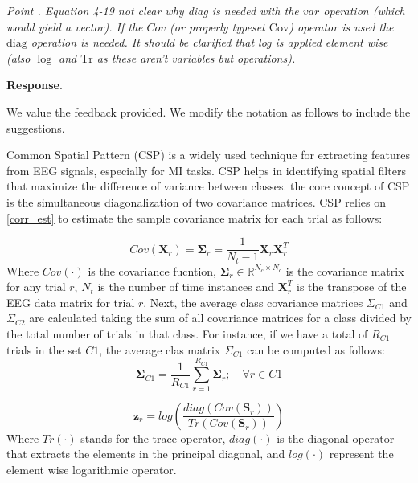 \documentclass[runningheads]{llncs}
\newcommand{\Real}{\mathbb{R}}
\newcommand{\Tr}[1]{Tr \left( #1 \right)}
\newcommand{\diag}[1]{diag \left( #1 \right)}
\newcommand{\ve}[1]{\bm {#1}}
\newcommand{\mat}[1]{\bm {#1}}
\newenvironment{reviewer}{\setcounter{pointcounter}{1}}{}
\newcommand{\changes}[1]{\textcolor[rgb]{1.00,0.00,0.00}{#1}}
\newcommand{\point}[1]{\medskip \noindent
 \textsl{{\fontseries{b}\selectfont Point \thepointcounter}.
 \stepcounter{pointcounter} #1}}
\newcommand{\reply}{\medskip \noindent \textbf{Response}.\ }
\begin{document}
\begin{reviewer}
{}

\point{Equation 4-19 not clear why diag is needed with the $var$ operation (which would yield a vector). If the $Cov$ (or properly typeset $\mathrm{Cov}$) operator is used the $\mathrm{diag}$ operation is needed.   It should be clarified that log is applied element wise (also $\log$ and $\mathrm{Tr}$ as these aren't variables but operations). }

\reply{
    We value the feedback provided. We modify the notation as follows to include the suggestions.

    \changes{
    Common Spatial Pattern (CSP) is a widely used technique for extracting features from EEG signals, especially for MI tasks. CSP helps in identifying spatial filters that maximize the difference of variance between classes. the core concept of CSP is the simultaneous diagonalization of two covariance matrices. CSP relies on \cref{corr_est} to estimate the sample covariance matrix for each trial as follows:}
    
    \changes{
    \begin{equation}
        Cov(\mat{X}_r) = \mat{\Sigma}_{r} = \frac{1}{N_{t}-1} \mat{X}_r \mat{X}_{r}^T
    \end{equation}
    }
    \changes{
    Where $Cov(\cdot)$ is the covariance fucntion, $\mat{\Sigma}_{r} \in \Real^{N_c \times N_c}$ is the covariance matrix for any trial $r$, $N_{t}$ is the number of time instances and $\mat{X}_{r}^{T}$ is the transpose of the EEG data matrix for trial $r$.
    }
    \changes{
    Next, the average class covariance matrices $\Sigma_{C1}$ and $\Sigma_{C2}$ are calculated taking the sum of all covariance matrices for a class  divided by the total number of trials in that class. For instance, if we have a total of $R_{C1}$ trials in the set $C1$, the average clas matrix $\Sigma_{C1}$ can be computed as follows:
    }
    \changes{
    \begin{equation}
    \mat{\Sigma}_{C1} = \frac{1}{R_{C1}} \sum_{{r}=1}^{R_{C1}} \mat{\Sigma}_{r};\quad \forall r \in C1     
    \end{equation}
    }


    \changes{
    \begin{equation}\label{eq:CSPfeats}
    \ve{z}_r = log \left( \frac{\diag{Cov({\mat{S}}_{r})}}{\Tr{Cov(\mat{S}_{r})}}  \right)  
    \end{equation}
    }
    \changes{
    Where $\Tr{\cdot}$ stands for the trace operator, $\diag{\cdot}$ is the diagonal operator that extracts the elements in the principal diagonal, and $log(\cdot)$ represent the element wise logarithmic operator}.
}


\end{reviewer}
\end{document}
